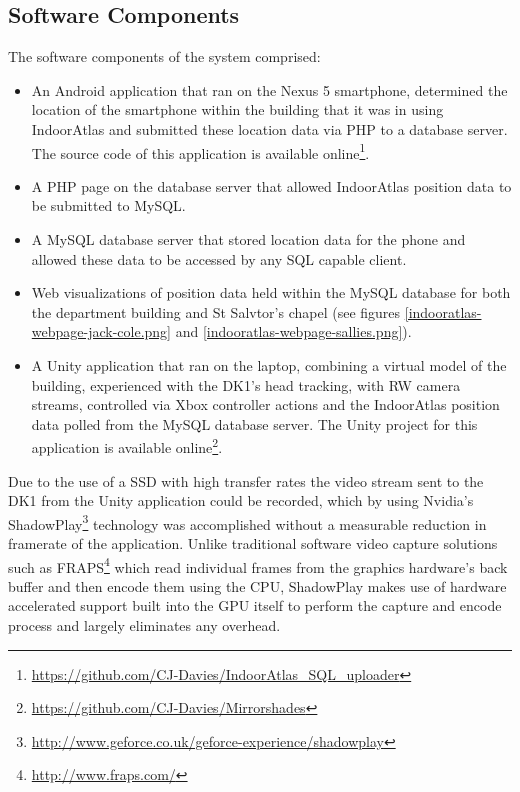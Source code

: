 \subsection{Software Components}
The software components of the system comprised:
\begin{itemize}
	\item An Android application that ran on the Nexus 5 smartphone, determined the location of the smartphone within the building that it was in using IndoorAtlas and submitted these location data via PHP to a database server. The source code of this application is available online\footnote{\url{https://github.com/CJ-Davies/IndoorAtlas_SQL_uploader}}.
	\item A PHP page on the database server that allowed IndoorAtlas position data to be submitted to MySQL.
	\item A MySQL database server that stored location data for the phone and allowed these data to be accessed by any SQL capable client.
	\item Web visualizations of position data held within the MySQL database for both the department building and St Salvtor's chapel (see figures \ref{indooratlas-webpage-jack-cole.png} and \ref{indooratlas-webpage-sallies.png}).
	\item A Unity application that ran on the laptop, combining a virtual model of the building, experienced with the DK1's head tracking, with RW camera streams, controlled via Xbox controller actions and the IndoorAtlas position data polled from the MySQL database server. The Unity project for this application is available online\footnote{\url{https://github.com/CJ-Davies/Mirrorshades}}.
\end{itemize}

Due to the use of a SSD with high transfer rates the video stream sent to the DK1 from the Unity application could be recorded, which by using Nvidia's ShadowPlay\footnote{\url{http://www.geforce.co.uk/geforce-experience/shadowplay}} technology was accomplished without a measurable reduction in framerate of the application. Unlike traditional software video capture solutions such as FRAPS\footnote{\url{http://www.fraps.com/}} which read individual frames from the graphics hardware's back buffer and then encode them using the CPU, ShadowPlay makes use of hardware accelerated support built into the GPU itself to perform the capture and encode process and largely eliminates any overhead.

